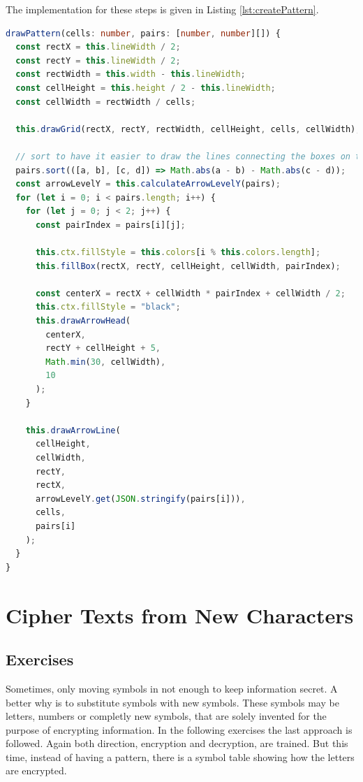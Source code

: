The implementation for these steps is given in Listing \ref{lst:createPattern}.

\begin{lstlisting}[language=TypeScript,caption={Implementation to draw the pattern on a canvas element},label={lst:drawPattern}]
drawPattern(cells: number, pairs: [number, number][]) {
  const rectX = this.lineWidth / 2;
  const rectY = this.lineWidth / 2;
  const rectWidth = this.width - this.lineWidth;
  const cellHeight = this.height / 2 - this.lineWidth;
  const cellWidth = rectWidth / cells;

  this.drawGrid(rectX, rectY, rectWidth, cellHeight, cells, cellWidth);

  // sort to have it easier to draw the lines connecting the boxes on the correct height
  pairs.sort(([a, b], [c, d]) => Math.abs(a - b) - Math.abs(c - d));
  const arrowLevelY = this.calculateArrowLevelY(pairs);
  for (let i = 0; i < pairs.length; i++) {
    for (let j = 0; j < 2; j++) {
      const pairIndex = pairs[i][j];

      this.ctx.fillStyle = this.colors[i % this.colors.length];
      this.fillBox(rectX, rectY, cellHeight, cellWidth, pairIndex);

      const centerX = rectX + cellWidth * pairIndex + cellWidth / 2;
      this.ctx.fillStyle = "black";
      this.drawArrowHead(
        centerX,
        rectY + cellHeight + 5,
        Math.min(30, cellWidth),
        10
      );
    }

    this.drawArrowLine(
      cellHeight,
      cellWidth,
      rectY,
      rectX,
      arrowLevelY.get(JSON.stringify(pairs[i])),
      cells,
      pairs[i]
    );
  }
}
\end{lstlisting}

\section{Cipher Texts from New Characters}
\label{section:symbols}

\subsection{Exercises}
Sometimes, only moving symbols in not enough to keep information secret. A better why is to substitute symbols with new symbols. These symbols may be letters, numbers or completly new symbols, that are solely invented for the purpose of encrypting information.
In the following exercises the last approach is followed. Again both direction, encryption and decryption, are trained. But this time, instead of having a pattern, there is a symbol table showing how the letters are encrypted. 

